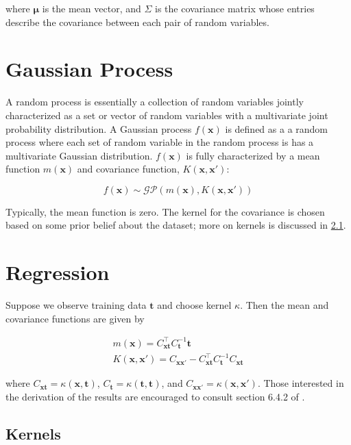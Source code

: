 \documentclass{article}
\begin{document}
where $\boldsymbol{\mu}$ is the mean vector, and $\Sigma$ is the covariance matrix whose entries describe the covariance
between each pair of random variables.

\section{Gaussian Process}

A random process is essentially a collection of random variables jointly characterized  as a set or vector of random
variables with a multivariate joint probability distribution. A Gaussian process $f(\boldsymbol{x})$ is defined as a a
random process where each set of random variable in the random process is has a multivariate Gaussian distribution.
$f(\boldsymbol{x})$ is fully characterized by a mean function  $m(\boldsymbol{x})$ and covariance function,
$K(\boldsymbol{x},\boldsymbol{x'})$:

\[
  f(\boldsymbol{x})\sim\mathcal{GP}(m(\boldsymbol{x}),K(\boldsymbol{x},\boldsymbol{x'}))
\]

Typically, the mean function is zero. The kernel for the covariance is chosen based on some prior belief about the
dataset; more on kernels is discussed in \ref{subsection:kernels}.

\section{Regression}

Suppose we observe training data $\boldsymbol{t}$ and choose kernel $\kappa$. Then the mean and covariance functions are
given by 

\begin{gather*}
  m(\boldsymbol{x})=C_{\boldsymbol{x}\boldsymbol{t}}^\top C_{\boldsymbol{t}}^{-1}\boldsymbol{t} \\
  K(\boldsymbol{x},\boldsymbol{x'})=C_{\boldsymbol{x}\boldsymbol{x'}}-C_{\boldsymbol{x}\boldsymbol{t}}^\top
  C_{\boldsymbol{t}}^{-1}C_{\boldsymbol{x}\boldsymbol{t}}
\end{gather*}

where $C_{\boldsymbol{x}\boldsymbol{t}} = \kappa(\boldsymbol{x},\boldsymbol{t})$, $C_{\boldsymbol{t}} =
\kappa(\boldsymbol{t},\boldsymbol{t})$, and $C_{\boldsymbol{x}\boldsymbol{x'}} =
\kappa(\boldsymbol{x},\boldsymbol{x'})$.  Those interested in the derivation of the results are encouraged to consult
section 6.4.2 of \cite{bishop_pattern_2006}.

\subsection{Kernels} \label{subsection:kernels}
\end{document}
